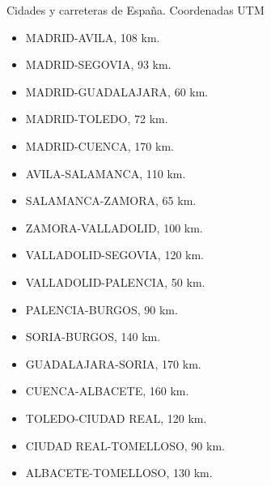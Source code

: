 \documentclass[11pt, a4paper, spanish, openright, twoside]{book}
\begin{document}
\begin{section}{Cidades y carreteras de España. Coordenadas UTM}
			\begin{itemize}
				\item	MADRID-AVILA, 108 km.
				\item	MADRID-SEGOVIA, 93 km.
				\item	MADRID-GUADALAJARA, 60 km.
				\item	MADRID-TOLEDO, 72 km.
				\item	MADRID-CUENCA, 170 km.
				\item	AVILA-SALAMANCA, 110 km.
				\item	SALAMANCA-ZAMORA, 65 km.
				\item	ZAMORA-VALLADOLID, 100 km.
				\item	VALLADOLID-SEGOVIA, 120 km.
				\item	VALLADOLID-PALENCIA, 50 km.
				\item	PALENCIA-BURGOS, 90 km.
				\item	SORIA-BURGOS, 140 km.
				\item	GUADALAJARA-SORIA, 170 km.
				\item	CUENCA-ALBACETE, 160 km.
				\item	TOLEDO-CIUDAD REAL, 120 km.
				\item	CIUDAD REAL-TOMELLOSO, 90 km.
				\item	ALBACETE-TOMELLOSO, 130 km.

	
			\end{itemize}
	\end{section}
\end{document}
